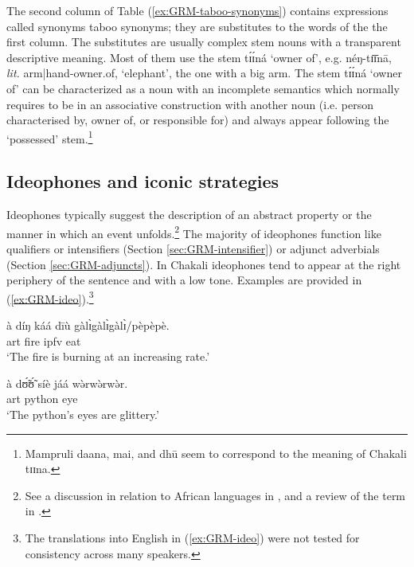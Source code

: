 \begin{exe}
\begin{exe}
\begin{exe}
\begin{exe}
\begin{exe}
\begin{exe}
\begin{exe}
\begin{exe}
\begin{exe}
\begin{exe}
\begin{exe}
\begin{exe}
The second column of  Table (\ref{ex:GRM-taboo-synonyms}) contains expressions called  synonyms taboo  synonyms; they are substitutes to the words of the  the first column.  The substitutes  are usually  complex stem nouns with a transparent descriptive meaning. Most of them use the stem {\sls tɪ́ɪ́ná} `owner of', e.g. {\sls néŋ-tɪ̄ɪ̄nā}, {\it lit.} arm|hand-owner.of,  `elephant',  the one with a big arm.  The stem {\sls tɪ́ɪ́ná}  `owner of'  can be characterized as a noun with an incomplete semantics which normally requires to be in an associative construction with another noun (i.e. person characterised by, owner of, or responsible for) and always appear following the `possessed’ stem.\footnote{Mampruli {\sls daana},  {\sls mai}, and   {\sls dhū} seem to correspond to the meaning of Chakali {\sls tɪɪna}.}


\subsection{Ideophones and iconic strategies} 
\label{sec:GRM-onoma}

 Ideophones typically suggest the description of an abstract property or the manner in which an event unfolds.\footnote{See a discussion in relation to African languages in  \citet{sama01}, and a  review of the term in \citet{newm68, voel01, ding11}.}  The majority of ideophones function like  qualifiers or intensifiers (Section \ref{sec:GRM-intensifier}) or adjunct adverbials  (Section \ref{sec:GRM-adjuncts}). In Chakali ideophones tend to appear at the right periphery of the sentence and with a low tone. Examples are provided in (\ref{ex:GRM-ideo}).\footnote{The translations into English in (\ref{ex:GRM-ideo}) were not 
tested for consistency across many speakers.}
          

\ea\label{ex:GRM-ideo}

 \ea\label{ex:GRM-ideo-dxm}
\gll  à díŋ káá dīù gàlɪ̀gàlɪ̀gàlɪ̀/pèpèpè.\\
{\sc art} fire {\sc ipfv} eat  {\ideo}\\
  \glt `The fire is burning at an increasing rate.'


 \ex\label{ex:GRM-ideo-qual}
\gll à dʊ̃́ʊ̃́ síè jáá wə̀rwə̀rwə̀r.\\
{\sc art} python eye {\ident} {\ideo}\\
  \glt `The python's eyes are glittery.'


\end{exe}
\end{exe}
\end{exe}
\end{exe}
\end{exe}
\end{exe}
\end{exe}
\end{exe}
\end{exe}
\end{exe}
\end{exe}
\end{exe}

